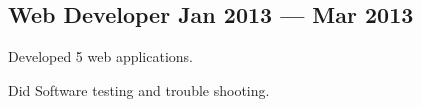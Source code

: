 \documentclass[letter,10pt]{article}
\begin{document}
\subsection{{Web Developer \hfill Jan 2013 --- Mar 2013}}
\begin{zitemize}
\item Developed 5 web applications.
\item Did Software testing and trouble shooting.

\end{zitemize}
\end{document}
